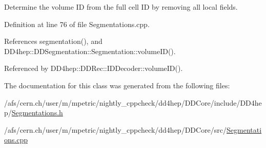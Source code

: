 Determine the volume ID from the full cell ID by removing all local fields. 

Definition at line 76 of file Segmentations.cpp.

References segmentation(), and DD4hep::DDSegmentation::Segmentation::volumeID().

Referenced by DD4hep::DDRec::IDDecoder::volumeID().

The documentation for this class was generated from the following files:\begin{DoxyCompactItemize}
\item 
/afs/cern.ch/user/m/mpetric/nightly\_\-cppcheck/dd4hep/DDCore/include/DD4hep/\hyperlink{_segmentations_8h}{Segmentations.h}\item 
/afs/cern.ch/user/m/mpetric/nightly\_\-cppcheck/dd4hep/DDCore/src/\hyperlink{_segmentations_8cpp}{Segmentations.cpp}\end{DoxyCompactItemize}
